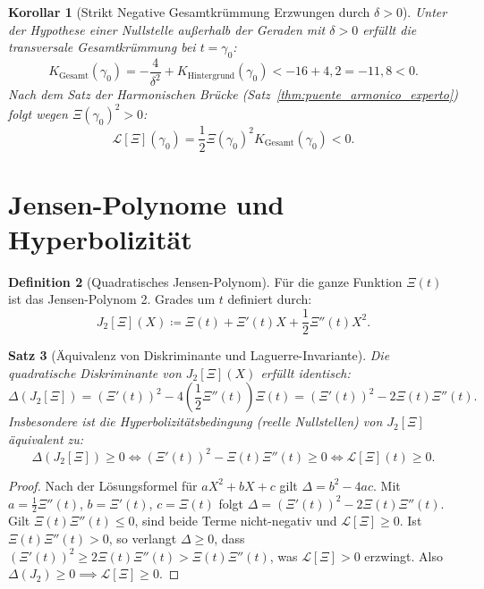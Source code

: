 \documentclass[11pt,a4paper]{article}
\newtheorem{theorem}{Satz}[section]
\newtheorem{corollary}[theorem]{Korollar}
\theoremstyle{definition}
\newtheorem{definition}[theorem]{Definition}
\theoremstyle{remark}
\begin{document}
\begin{corollary}[Strikt Negative Gesamtkrümmung Erzwungen durch $\delta > 0$]
\label{cor:curvatura_negativa_forzada}
Unter der Hypothese einer Nullstelle außerhalb der Geraden mit $\delta > 0$ erfüllt die transversale Gesamtkrümmung bei $t = \gamma_0$:
\begin{equation}
K_{\mathrm{Gesamt}}(\gamma_0) = -\frac{4}{\delta^2} + K_{\mathrm{Hintergrund}}(\gamma_0) < -16 + 4{,}2 = -11{,}8 < 0.
\end{equation}
Nach dem Satz der Harmonischen Brücke (Satz~\ref{thm:puente_armonico_experto}) folgt wegen $\Xi(\gamma_0)^2 > 0$:
\begin{equation}
\label{eq:laguerre_negativo_obligatorio}
\mathcal{L}[\Xi](\gamma_0) = \frac{1}{2} \Xi(\gamma_0)^2 K_{\mathrm{Gesamt}}(\gamma_0) < 0.
\end{equation}
\end{corollary}

\section{Jensen-Polynome und Hyperbolizität}

\begin{definition}[Quadratisches Jensen-Polynom]
Für die ganze Funktion $\Xi(t)$ ist das Jensen-Polynom 2. Grades um $t$ definiert durch:
\begin{equation}
J_2[\Xi](X) \coloneqq \Xi(t) + \Xi'(t) X + \frac{1}{2} \Xi''(t) X^2.
\end{equation}
\end{definition}

\begin{theorem}[Äquivalenz von Diskriminante und Laguerre-Invariante]
Die quadratische Diskriminante von $J_2[\Xi](X)$ erfüllt identisch:
\begin{equation}
\Delta(J_2[\Xi]) = (\Xi'(t))^2 - 4\left(\frac{1}{2}\Xi''(t)\right)\Xi(t) = (\Xi'(t))^2 - 2 \Xi(t)\Xi''(t).
\end{equation}
Insbesondere ist die Hyperbolizitätsbedingung (reelle Nullstellen) von $J_2[\Xi]$ äquivalent zu:
\begin{equation}
\Delta(J_2[\Xi]) \ge 0 \iff (\Xi'(t))^2 - \Xi(t)\Xi''(t) \ge 0 \iff \mathcal{L}[\Xi](t) \ge 0.
\end{equation}
\end{theorem}

\begin{proof}
Nach der Lösungsformel für $a X^2 + b X + c$ gilt $\Delta = b^2 - 4ac$. Mit $a = \frac{1}{2}\Xi''(t)$, $b = \Xi'(t)$, $c = \Xi(t)$ folgt $\Delta = (\Xi'(t))^2 - 2\Xi(t)\Xi''(t)$. Gilt $\Xi(t)\Xi''(t) \le 0$, sind beide Terme nicht-negativ und $\mathcal{L}[\Xi] \ge 0$. Ist $\Xi(t)\Xi''(t) > 0$, so verlangt $\Delta \ge 0$, dass $(\Xi'(t))^2 \ge 2\Xi(t)\Xi''(t) > \Xi(t)\Xi''(t)$, was $\mathcal{L}[\Xi] > 0$ erzwingt. Also $\Delta(J_2) \ge 0 \implies \mathcal{L}[\Xi] \ge 0$.
\end{proof}
\end{document}
